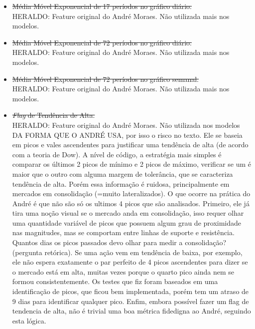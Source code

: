 \begin{itemize}
    \item \sout{Média Móvel Exponencial de 17 períodos no gráfico diário.} \\
    \color{red} HERALDO: Feature original do André Moraes. Não utilizada mais nos modelos. 

    \item \sout{Média Móvel Exponencial de 72 períodos no gráfico diário.} \\
    \color{red} HERALDO: Feature original do André Moraes. Não utilizada mais nos modelos. 

    \item \sout{Média Móvel Exponencial de 72 períodos no gráfico semanal.} \\
    \color{red} HERALDO: Feature original do André Moraes. Não utilizada mais nos modelos. 

    \item \sout{\textit{Flag} de Tendência de Alta.} \\
    \color{red} HERALDO: Feature original do André Moraes. Não utilizada nos modelos DA FORMA QUE O ANDRÉ USA, por isso o risco no texto. Ele se baseia em picos e vales ascendentes para justificar uma tendência de alta (de acordo com a teoria de Dow). A nível de código, a estratégia mais simples é comparar os últimos 2 picos de mínimo e 2 picos de máximo, verificar se um é maior que o outro com alguma margem de tolerância, que se caracteriza tendência de alta. Porém essa informação é ruidosa, principalmente em mercados em consolidação (=muito lateralizados). O que ocorre na prática do André é que não são só os ultimos 4 picos que são analisados. Primeiro, ele já tira uma noção visual se o mercado anda em consolidação, isso requer olhar uma quantidade variável de picos que possuem algum grau de proximidade nas magnitudes, mas se comportam entre linhas de suporte e resistência. Quantos dias os picos passados devo olhar para medir a consolidação? (pergunta retórica). Se uma ação vem em tendência de baixa, por exemplo, ele não espera exatamente o par perfeito de 4 picos ascendentes para dizer se o mercado está em alta, muitas vezes porque o quarto pico ainda nem se formou consistentemente. Os testes que fiz foram baseados em uma identificação de picos, que ficou bem implementada, porém tem um atraso de 9 dias para identificar qualquer pico. Enfim, embora possível fazer um flag de tendencia de alta, não é trivial uma boa métrica fidedigna ao André, seguindo esta lógica. 


\end{itemize}
